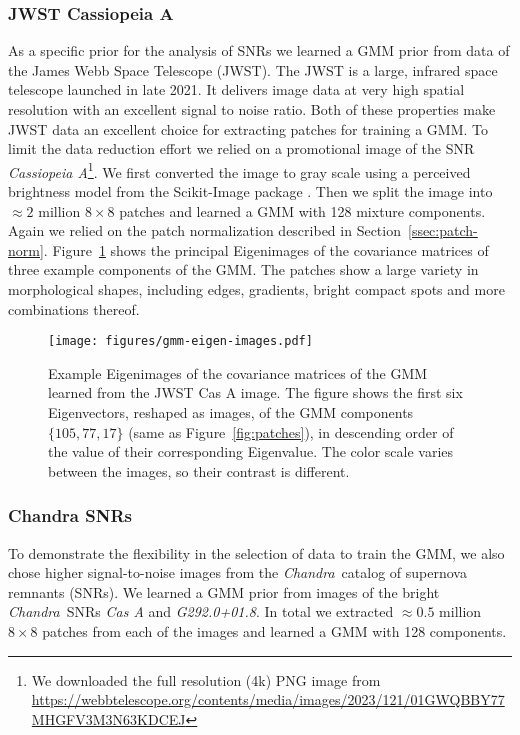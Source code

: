 \documentclass[twocolumn, linenumbers]{aastex631}
\newcommand{\chandra}{\textit{Chandra}~}
\begin{document}
    \subsubsection{JWST Cassiopeia A}
    As a specific prior for the analysis of SNRs we learned a GMM prior from data of the James Webb Space Telescope (JWST). The JWST is a large, infrared space telescope launched in late 2021. It delivers image data at very high spatial resolution with an excellent signal to noise ratio. Both of these properties make JWST data an excellent choice for extracting patches for training a GMM. To limit the data reduction effort we relied on a promotional image of the SNR \textit{Cassiopeia A}\footnote{We downloaded the full resolution (4k)  PNG image from \url{https://webbtelescope.org/contents/media/images/2023/121/01GWQBBY77MHGFV3M3N63KDCEJ}}. We first converted the image to gray scale using a perceived brightness model from the Scikit-Image package \citep{scikit-image}. Then we split the image into $\approx 2$ million $8\times 8$ patches and learned a GMM with 128 mixture components. Again we relied on the patch normalization described in Section~\ref{ssec:patch-norm}. Figure~\ref{fig:gmm-eigen-images} shows the principal Eigenimages of the covariance matrices of three example components of the GMM. The patches show a large variety in morphological shapes, including edges, gradients, bright compact spots and more combinations thereof.

    \begin{figure}
        \begin{centering}
            \texttt{[image: figures/gmm-eigen-images.pdf]}
            \caption{
                Example Eigenimages of the covariance matrices of the GMM learned from the JWST Cas A image. The figure shows the first six Eigenvectors, reshaped as images, of the GMM components $\{105, 77, 17\}$ (same as Figure~\ref{fig:patches}), in descending order of the value of their corresponding Eigenvalue. The color scale varies between the images, so their contrast is different. 
            }
            \label{fig:gmm-eigen-images}
        \end{centering}
    \end{figure}

    \subsubsection{Chandra SNRs}
    \label{sssec:chandra-snrs}
    To demonstrate the flexibility in the selection of data to train the GMM, we also chose higher signal-to-noise images from the \chandra catalog of supernova remnants (SNRs). We learned a GMM prior from images of the bright \chandra SNRs \textit{Cas A} and \textit{G292.0+01.8}. In total we extracted $\approx 0.5$ million $8\times 8$ patches from each of the images and learned a GMM with 128 components.
\end{document}
